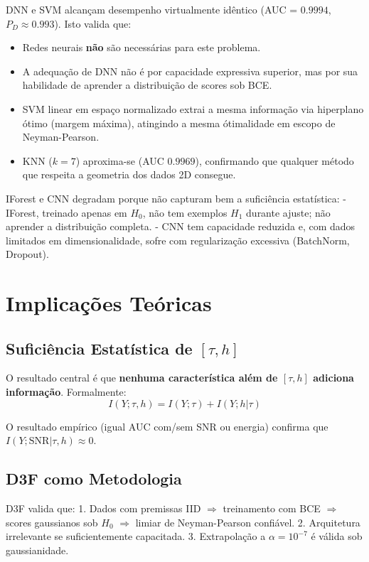 \documentclass[10pt, a4paper]{article}
\begin{document}
DNN e SVM alcançam desempenho virtualmente idêntico (AUC = $0.9994$, $P_D \approx 0.993$). Isto valida que:

\begin{itemize}
\item Redes neurais \textbf{não} são necessárias para este problema.
\item A adequação de DNN não é por capacidade expressiva superior, mas por sua habilidade de aprender a distribuição de scores sob BCE.
\item SVM linear em espaço normalizado extrai a mesma informação via hiperplano ótimo (margem máxima), atingindo a mesma ótimalidade em escopo de Neyman-Pearson.
\item KNN ($k=7$) aproxima-se (AUC $0.9969$), confirmando que qualquer método que respeita a geometria dos dados 2D consegue.
\end{itemize}

IForest e CNN degradam porque não capturam bem a suficiência estatística:
- IForest, treinado apenas em $H_0$, não tem exemplos $H_1$ durante ajuste; não aprender a distribuição completa.
- CNN tem capacidade reduzida e, com dados limitados em dimensionalidade, sofre com regularização excessiva (BatchNorm, Dropout).

\section{Implicações Teóricas}

\subsection{Suficiência Estatística de $[\tau, h]$}

O resultado central é que \textbf{nenhuma característica além de $[\tau, h]$ adiciona informação}. Formalmente:
$$I(Y; \tau, h) = I(Y; \tau) + I(Y; h | \tau)$$

O resultado empírico (igual AUC com/sem SNR ou energia) confirma que $I(Y; \text{SNR} | \tau, h) \approx 0$.

\subsection{D3F como Metodologia}

D3F valida que:
1. Dados com premissas IID $\Rightarrow$ treinamento com BCE $\Rightarrow$ scores gaussianos sob $H_0$ $\Rightarrow$ limiar de Neyman-Pearson confiável.
2. Arquitetura irrelevante se suficientemente capacitada.
3. Extrapolação a $\alpha = 10^{-7}$ é válida sob gaussianidade.
\end{document}

